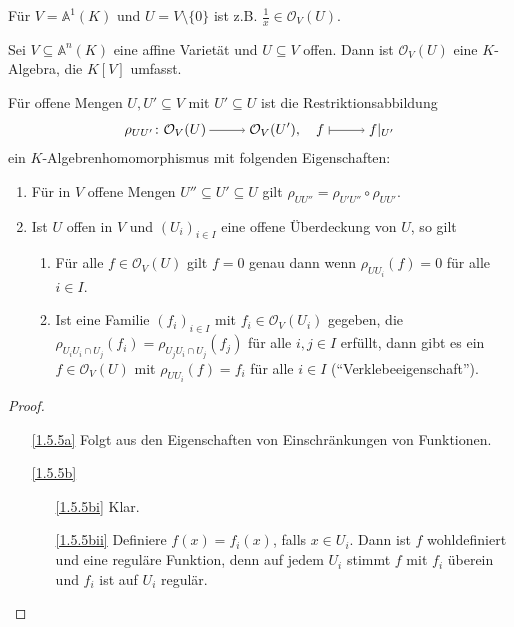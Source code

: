 \documentclass[a4paper,12pt]{scrbook}
\theoremstyle{keinenummern} %
\theoremstyle{mitnummern}
\theoremstyle{unserbeweis}
\newtheorem{proof}{Beweis}
\def\A{\mathbb{A}}
\def\O{\mathcal{O}}
\newcommand{\restrict}[1]{|_{#1}}
\newcommand{\ra}{\raisebox{-1pt}{\tikz{\draw[thin,shorten >=3pt, ->] (0,0) node{\hspace*{-2pt}} -- node{} (1,0);}}\penalty1000\relax}
\renewcommand{\mapsto}{\raisebox{-1pt}{\tikz{\draw[thin,shorten >=3pt, |->] (0,0) node{\hspace*{0pt}} -- node{} (1,0);}}\penalty1000\relax}
\begin{document}
\begin{nbsp}
  Für $V=\A^1(K)$ und $U=V\setminus\{0\}$ ist z.B. $\frac1x\in\O_V(U)$.
\end{nbsp}

\begin{bem}\label{1.5.4}
  Sei $V\subseteq\A^n(K)$ eine affine Varietät und $U\subseteq V$ offen. Dann ist $\O_V(U)$ eine $K$-Algebra, die $K[V]$
  umfasst.
\end{bem}

\begin{bem}\label{1.5.5}
  Für offene Mengen $U,U'\subseteq V$ mit $U'\subseteq U$ ist die Restriktionsabbildung
  \[ \rho_{UU'}\colon \O_V(U)\ra\O_V(U'),\quad f\mapsto f\restrict{U'} \]
  ein $K$-Algebrenhomomorphismus mit folgenden Eigenschaften:
  \begin{enumerate}
  \item{} Für in $V$ offene Mengen $U''\subseteq U'\subseteq U$ gilt $\rho_{UU''}=\rho_{U'U''}\circ\rho_{UU'}$.
  \item{} Ist $U$ offen in $V$ und $(U_i)_{i\in I}$ eine offene Überdeckung von $U$, so gilt
    \begin{enumerate}
    \item{} Für alle $f\in\O_V(U)$ gilt $f=0$ genau dann wenn $\rho_{UU_i}(f)=0$ für alle $i\in I$.
    \item{} Ist eine Familie $(f_i)_{i\in I}$ mit $f_i\in\O_V(U_i)$ gegeben, die $\rho_{U_iU_i\cap
        U_j}(f_i)=\rho_{U_jU_i\cap U_j}(f_j)$  für alle $i,j\in I$ erfüllt, dann gibt es ein $f\in\O_V(U)$ mit
      $\rho_{UU_i}(f)=f_i$ für alle $i\in I$
      (\enquote{Verklebeeigenschaft}).
    \end{enumerate}
  \end{enumerate}
\end{bem}
\begin{proof}
  \begin{enumerate}
  \item[\ref{1.5.5a}] Folgt aus den Eigenschaften von Einschränkungen von Funktionen.
  \item[\ref{1.5.5b}]
    \begin{enumerate}
    \item[\ref{1.5.5bi}] Klar.
    \item[\ref{1.5.5bii}] Definiere $f(x)=f_i(x)$, falls $x\in U_i$. Dann ist $f$ wohldefiniert und eine reguläre Funktion, denn
      auf jedem $U_i$  stimmt $f$ mit $f_i$ überein und $f_i$ ist auf $U_i$ regulär.
    \end{enumerate}
  \end{enumerate}
\end{proof}
\end{document}
